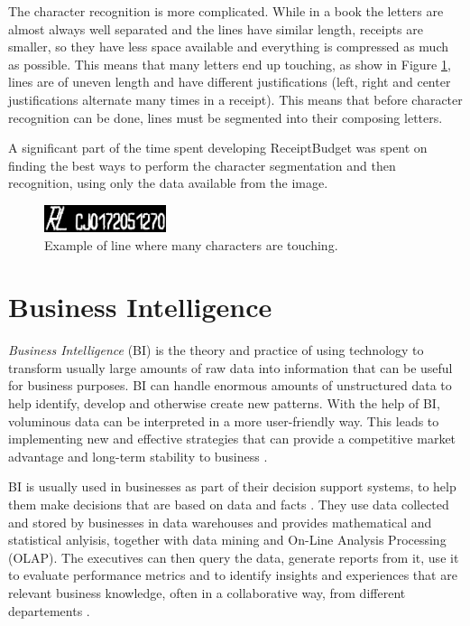 The character recognition is more complicated. While in a book the letters are almost always well separated and the lines have similar length, receipts are smaller, so they have less space available and everything is compressed as much as possible. This means that many letters end up touching, as show in Figure \ref{fig:line}, lines are of uneven length and have different justifications (left, right and center justifications alternate many times in a receipt). This means that before character recognition can be done, lines must be segmented into their composing letters. 

A significant part of the time spent developing ReceiptBudget was spent on finding the best ways to perform the character segmentation and then recognition, using only the data available from the image. 

\begin{figure}[h!]
\begin{center}
\includegraphics[width=0.7\columnwidth]{img/linie_bon.jpg}
\caption{\label{fig:line}
Example of line where many characters are touching.}
\end{center}
\end{figure}

\section{Business Intelligence}
\textit{Business Intelligence} (BI) is the theory and practice of using technology to transform usually large amounts of raw data into information that can be useful for business purposes. BI can handle enormous amounts of unstructured data to help identify, develop and otherwise create new patterns. With the help of BI, voluminous data can be interpreted in a more user-friendly way. This leads to implementing new and effective strategies that can provide a competitive market advantage and long-term stability to business \cite{rud2009business}.

BI is usually used in businesses as part of their decision support systems, to help them make decisions that are based on data and facts \cite{power2007brief}. They use data collected and stored by businesses in data warehouses and provides mathematical and statistical anlyisis, together with data mining and On-Line Analysis Processing (OLAP). The executives can then query the data, generate reports from it, use it  to evaluate performance metrics and to identify insights and experiences that are relevant business knowledge, often in a collaborative way, from different departements \cite{Ghazanfari20111579}. 

